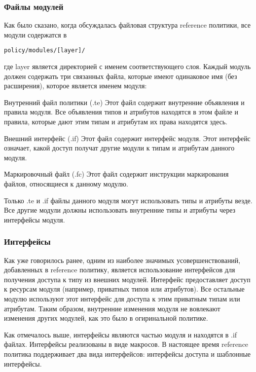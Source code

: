 \documentclass{./../class/UIR}
\begin{document}
\subsubsection{Файлы модулей}
	
	Как было сказано, когда обсуждалась файловая структура reference политики, все
	модули содержатся в \begin{verbatim}policy/modules/[layer]/\end{verbatim} где
	layer является директорией с именем соответствующего слоя. Каждый модуль должен
	содержать три связанных файла, которые имеют одинаковое имя (без расширения),
	которое является именем модуля:

    \begin{description}
      \item Внутренний файл политики (.te) Этот файл содержит внутренние объявления
      и правила модуля. Все объявления типов и атрибутов находятся в этом файле и
      правила, которые дают этим типам и атрибутам их права находятся здесь.
      \item Внешний интерфейс (.if) Этот файл содержит интерфейс модуля. Этот
      интерфейс означает, какой доступ получат другие модули к типам и атрибутам
      данного модуля.
      \item Маркировочный файл (.fc) Этот файл содержит инструкции маркирования
      файлов, относящиеся к данному модулю.
    \end{description}

    Только .te и .if файлы данного модуля могут использовать типы и атрибуты везде.
    Все другие модули должны использовать внутренние типы и атрибуты через
    интерфейсы модуля.

\subsubsection{Интерфейсы}
	Как уже говорилось ранее, одним из наиболее значимых усовершенствований,
	добавленных в reference политику, является использование интерфейсов для
	получения доступа к типу из внешних модулей. Интерфейс предоставляет доступ к
	ресурсам модуля (например, приватных типов или атрибутов). Все остальные
	модулю используют этот интерфейс для доступа к этим приватным типам или
	атрибутам. Таким образом, внутренние изменения модуля не вовлекают изменения
	других модулей, как это было в огиринальной политике.
	
	Как отмечалось выше, интерфейсы являются частью модуля и находятся в .if
	файлах. Интерфейсы реализованы в виде макросов. В настоящее время reference
	политика поддерживает два вида интерфейсов: интерфейсы доступа и шаблонные
	интерфейсы.
\end{document}
